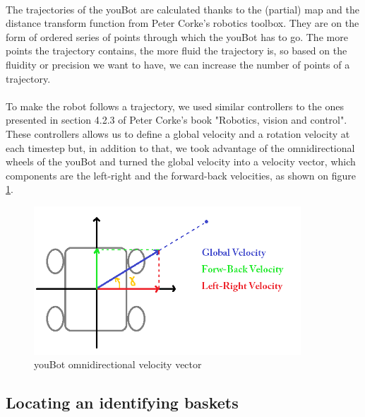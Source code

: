 \documentclass[12pt,a4paper]{article}
\begin{document}
\paragraph{}
The trajectories of the youBot are calculated thanks to the (partial) map and the distance transform function from Peter Corke's robotics toolbox\cite{CorkeRTB}. They are on the form of ordered series of points through which the youBot has to go. The more points the trajectory contains, the more fluid the trajectory is, so based on the fluidity or precision we want to have, we can increase the number of points of a trajectory. 

\paragraph{}
To make the robot follows a trajectory, we used similar controllers to the ones presented in section 4.2.3 of Peter Corke's book "Robotics, vision and control"\cite{CorkeBook}. These controllers allows us to define a global velocity and a rotation velocity at each timestep but, in addition to that, we took advantage of the omnidirectional wheels of the youBot and turned the global velocity into a velocity vector, which components are the left-right and the forward-back velocities, as shown on figure \ref{velocities}.

\begin{figure}[h]
	\centering
		\includegraphics[width=10cm]{velocities.png}
	\caption{youBot omnidirectional velocity vector}
	\label{velocities}
\end{figure}

\FloatBarrier

\subsection{Locating an identifying baskets}

\paragraph{}
\end{document}
